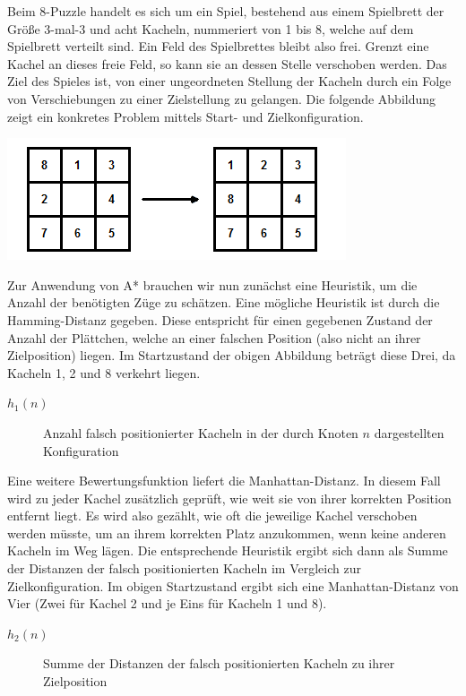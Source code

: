 Beim 8-Puzzle handelt es sich um ein Spiel, bestehend aus einem Spielbrett der Größe 3-mal-3 und acht Kacheln, nummeriert von 1 bis 8, welche auf dem Spielbrett verteilt sind. Ein Feld des Spielbrettes bleibt also frei. Grenzt eine Kachel an dieses freie Feld, so kann sie an dessen Stelle verschoben werden. Das Ziel des Spieles ist, von einer ungeordneten Stellung der Kacheln durch ein Folge von Verschiebungen zu einer Zielstellung zu gelangen.
Die folgende Abbildung zeigt ein konkretes Problem mittels Start- und Zielkonfiguration.

\includegraphics[scale=0.7]{chapters/informed_search/startziel.png}

Zur Anwendung von A* brauchen wir nun zunächst eine Heuristik, um die Anzahl der benötigten Züge zu schätzen. Eine mögliche Heuristik ist durch die Hamming-Distanz gegeben. Diese entspricht für einen gegebenen Zustand der Anzahl der Plättchen, welche an einer falschen Position (also nicht an ihrer Zielposition) liegen. Im Startzustand der obigen Abbildung beträgt diese Drei, da Kacheln 1, 2 und 8 verkehrt liegen.

\begin{description}
	\item[$h_{1}(n)$]{Anzahl falsch positionierter Kacheln in der durch Knoten $n$ dargestellten Konfiguration}
\end{description}

Eine weitere Bewertungsfunktion liefert die Manhattan-Distanz. In diesem Fall wird zu jeder Kachel zusätzlich geprüft, wie weit sie von ihrer korrekten Position entfernt liegt. Es wird also gezählt, wie oft die jeweilige Kachel verschoben werden müsste, um an ihrem korrekten Platz anzukommen, wenn keine anderen Kacheln im Weg lägen. Die entsprechende Heuristik ergibt sich dann als Summe der Distanzen der falsch positionierten Kacheln im Vergleich zur Zielkonfiguration. Im obigen Startzustand ergibt sich eine Manhattan-Distanz von Vier (Zwei für Kachel 2 und je Eins für Kacheln 1 und 8).

\begin{description}
	\item[$h_{2}(n)$]{Summe der Distanzen der falsch positionierten Kacheln zu ihrer Zielposition}
\end{description}

